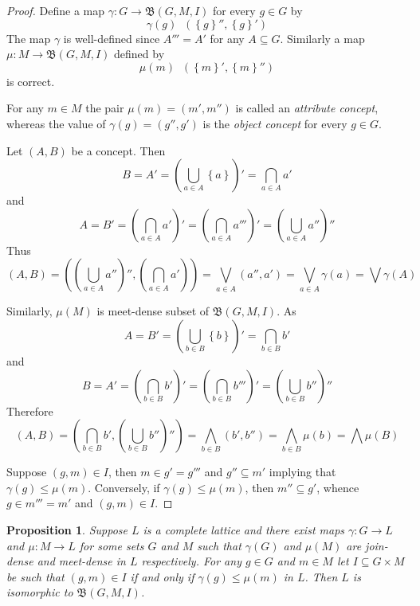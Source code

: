 \documentclass[a4paper]{article}
\newcommand{\obj}[1]{{\left\{ #1 \right \}}}
\newcommand{\brac}[1]{{\left ( #1 \right )}}
\newcommand{\cltc}{\mathfrak{B}}
\newtheorem{prop}{Proposition}
\newcommand{\defn}{\mathop{\overset{\Delta}{=}}\nolimits}
\begin{document}
\begin{proof}
Define a map $\gamma:G\to \cltc(G,M,I)$ for every $g\in G$ by \[\gamma(g) \defn \brac{\obj{g}'', \obj{g}'}\] The map $\gamma$ is well-defined since $A'''=A'$ for any $A\subseteq G$. Similarly a map $\mu:M\to \cltc(G,M,I)$ defined by \[\mu(m)\defn \brac{\obj{m}',\obj{m}''}\] is correct.

For any $m\in M$ the pair $\mu(m) = (m', m'')$ is called an \emph{attribute concept}, whereas the value of $\gamma(g) = (g'', g')$ is the \emph{object concept} for every $g\in G$.

Let $(A,B)$ be a concept. Then \[B = A' = \brac{\bigcup_{a\in A}\obj{a}}' = \bigcap_{a\in A} a'\] and \[A = B' = \brac{\bigcap_{a\in A} a'}' = \brac{\bigcap_{a\in A} a'''}' = \brac{\bigcup_{a\in A} a''}''\] Thus \[(A,B) = \brac{\brac{\bigcup_{a\in A} a''}'', \brac{\bigcap_{a\in A} a'}} = \bigvee_{a\in A} (a'',a') = \bigvee_{a\in A} \gamma(a) = \bigvee \gamma(A)\]

Similarly, $\mu(M)$ is meet-dense subset of $\cltc(G,M,I)$. As \[A = B' = \brac{\bigcup_{b\in B}\obj{b}}' = \bigcap_{b\in B} b'\] and \[B = A' = \brac{\bigcap_{b\in B} b'}' = \brac{\bigcap_{b\in B} b'''}' = \brac{\bigcup_{b\in B} b''}''\]
Therefore \[(A,B) = \brac{\bigcap_{b\in B} b', \brac{\bigcup_{b\in B} b''}''} = \bigwedge_{b\in B} (b', b'') = \bigwedge_{b\in B} \mu(b)=\bigwedge \mu(B)\]

Suppose $(g,m)\in I$, then $m\in g' = g'''$ and $g''\subseteq m'$ implying that $\gamma(g)\leq \mu(m)$. Conversely, if $\gamma(g)\leq \mu(m)$, then $m''\subseteq g'$, whence $g\in m''' = m'$ and $(g,m)\in I$.
\end{proof}

\begin{prop} Suppose $L$ is a complete lattice and there exist maps $\gamma:G\to L$ and $\mu:M\to L$ for some sets $G$ and $M$ such that $\gamma(G)$ and $\mu(M)$ are join-dense and meet-dense in $L$ respectively. For any $g\in G$ and $m\in M$ let $I\subseteq G\times M$ be such that $(g,m)\in I$ if and only if $\gamma(g)\leq \mu(m)$ in $L$. Then $L$ is isomorphic to $\cltc(G,M,I)$.
\end{prop}
\end{document}
